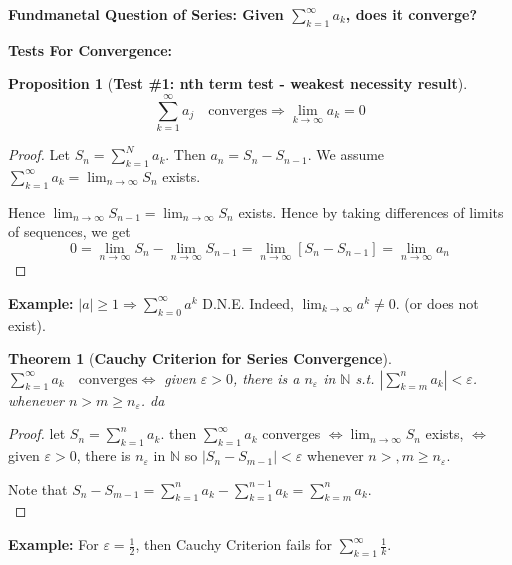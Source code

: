 \documentclass[12pt]{article}
\theoremstyle{plain}
\newtheorem{theorem}{Theorem}[subsection]
\newtheorem{proposition}{Proposition}[subsection]
\newcommand{\abs}[1]{\left| #1 \right|}
\newcommand{\mN}{{\mathbb{N}}}
\newcommand{\ep}{\varepsilon}
\begin{document}
\textbf{Fundmanetal Question of Series: Given $\sum_{k=1}^{\infty} a_k$, does 
it converge? }

\textbf{Tests For Convergence: }

\begin{proposition}[\textbf{Test \#1: nth term test - weakest necessity result}]
	\[
		\sum_{k=1}^{\infty} a_j \quad \text{converges}
		\Rightarrow \lim_{k\to\infty} a_k=0
	\]
\end{proposition}
\begin{proof}
	Let $S_n = \sum_{k=1}^N a_k$. Then $a_n = S_n - S_{n-1}$. We assume 
	$\sum_{k=1}^{\infty} a_k= \lim_{n\to\infty} S_n$ exists. 

	Hence $\lim_{n\to\infty} S_{n-1} = \lim_{n\to\infty} S_n$ exists. Hence by
	taking differences of limits of sequences, we get
	\[
		 0 = \lim_{n\to\infty} S_n - \lim_{n\to\infty} S_{n-1}
		 = \lim_{n\to\infty} [S_n - S_{n-1}]
		 = \lim_{n\to\infty} a_n
	\]
\end{proof}

{\color{Brown}
\textbf{Example:} $\abs a \geq 1\Rightarrow \sum_{k=0}^{\infty} a^k$ D.N.E. 
Indeed, $\lim_{k\to\infty} a^k \neq 0$. (or does not exist). }\\

\begin{theorem}[\textbf{Cauchy Criterion for Series Convergence}]
	$\sum_{k=1}^{\infty} a_k \quad \text{converges} \Leftrightarrow$
	given $\ep>0$, there is a $n_{\ep}$ in $\mN$ s.t.
	$\abs{\sum_{k=m}^n a_k} < \ep$. whenever $n > m \geq n_{\ep}$. da
\end{theorem}
\begin{proof}
	let $S_n = \sum_{k=1}^n a_k$. then 
	$\sum_{k=1}^{\infty} a_k$ converges $\Leftrightarrow \lim_{n\to\infty} S_n$
	exists, $\Leftrightarrow$ given $\ep>0$, there is $n_{\ep}$ in $\mN$ so 
	$\abs{S_n - S_{m-1}} < \ep$ whenever $n > ,m \geq n_{\ep}$. 

	Note that $S_n-S_{m-1} = \sum_{k=1}^n a_k - \sum_{k=1}^{n-1} a_k = 
	\sum_{k=m}^n a_k$. \\
\end{proof}

\textbf{Example: }For $\ep = \frac 12 $, then Cauchy Criterion fails for 
$\sum_{k=1}^{\infty} \frac 1k$. \\
\end{document}
